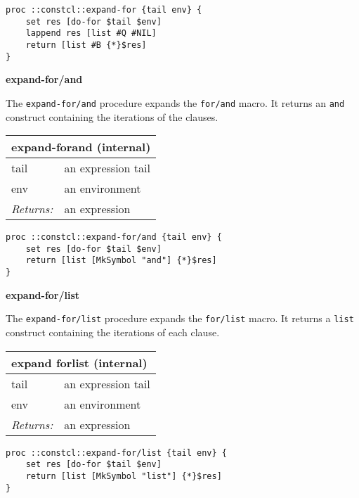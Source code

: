 \documentclass{report}
\begin{document}
\noindent\makebox[\linewidth]{\rule{\linewidth}{0.4pt}}
\begin{lstlisting}
proc ::constcl::expand-for {tail env} {
    set res [do-for $tail $env]
    lappend res [list #Q #NIL]
    return [list #B {*}$res]
}
\end{lstlisting}
\noindent\makebox[\linewidth]{\rule{\linewidth}{0.4pt}}

\textbf{expand-for/and}


The \texttt{expand-for/and} procedure expands the \texttt{for/and} macro. It returns an \texttt{and} construct containing the iterations of the clauses.

\begin{tabular}{ |l l| }
\hline
\multicolumn{2}{|l|}{expand-forand (internal)} \\
\hline
tail & an expression tail \\
env & an environment \\
\textit{Returns:} & an expression \\
\hline
\end{tabular}

\noindent\makebox[\linewidth]{\rule{\linewidth}{0.4pt}}
\begin{lstlisting}
proc ::constcl::expand-for/and {tail env} {
    set res [do-for $tail $env]
    return [list [MkSymbol "and"] {*}$res]
}
\end{lstlisting}
\noindent\makebox[\linewidth]{\rule{\linewidth}{0.4pt}}

\textbf{expand-for/list}


The \texttt{expand-for/list} procedure expands the \texttt{for/list} macro. It returns a \texttt{list} construct containing the iterations of each clause.

\begin{tabular}{ |l l| }
\hline
\multicolumn{2}{|l|}{expand forlist (internal)} \\
\hline
tail & an expression tail \\
env & an environment \\
\textit{Returns:} & an expression \\
\hline
\end{tabular}

\noindent\makebox[\linewidth]{\rule{\linewidth}{0.4pt}}
\begin{lstlisting}
proc ::constcl::expand-for/list {tail env} {
    set res [do-for $tail $env]
    return [list [MkSymbol "list"] {*}$res]
}
\end{lstlisting}
\noindent\makebox[\linewidth]{\rule{\linewidth}{0.4pt}}
\end{document}
